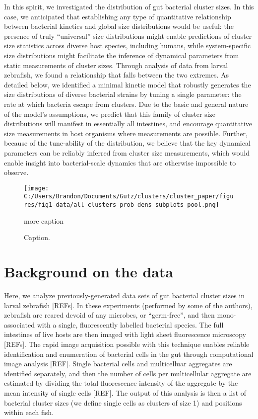 \documentclass[aps,pre,twocolumn]{revtex4-1}
\begin{document}
In this spirit, we investigated the distribution of gut bacterial cluster sizes. In this case, we anticipated that establishing any type of quantitative relationship between bacterial kinetics and global size distributions would be useful: the presence of truly ``universal'' size distributions might enable predictions of cluster size statistics across diverse host species, including humans, while system-specific size distributions might facilitate the inference of dynamical parameters from static measurements of cluster sizes. Through analysis of data from larval zebrafish, we found a relationship that falls between the two extremes. As detailed below, we identified a minimal kinetic model that robustly generates the size distributions of diverse bacterial strains by tuning a single parameter: the rate at which bacteria escape from clusters. Due to the basic and general nature of the model's assumptions, we predict that this family of cluster size distributions will manifest in essentially all intestines, and encourage quantitative size measurements in host organisms where measurements are possible. Further, because of the tune-ability of the distribution, we believe that the key dynamical parameters can be reliably inferred from cluster size measurements, which would enable insight into bacterial-scale dynamics that are otherwise impossible to observe. 

\begin{figure*}%
	\centerline{
		\texttt{[image: C:/Users/Brandon/Documents/Gutz/clusters/cluster\_paper/figures/fig1-data/all\_clusters\_prob\_dens\_subplots\_pool.png]}}
	\caption{Caption.}{more caption}
	\label{fig:data-fig}
\end{figure*}




\section{Background on the data}
Here, we analyze previously-generated data sets of gut bacterial cluster sizes in larval zebrafish [REFs]. In these experiments (performed by some of the authors), zebrafish are reared devoid of any microbes, or “germ-free”, and then mono-associated with a single, fluorescently labelled bacterial species. The full intestines of live hosts are then imaged with light sheet fluorescence microscopy [REFs]. The rapid image acquisition possible with this technique enables reliable identification and enumeration of bacterial cells in the gut through computational image analysis [REF]. Single bacterial cells and multicelluar aggregates are identified separately, and then the number of cells per multicellular aggregate are estimated by dividing the total fluorescence intensity of the aggregate by the mean intensity of single cells [REF]. The output of this analysis is then a list of bacterial cluster sizes (we define single cells as clusters of size 1) and positions within each fish. 
\end{document}
